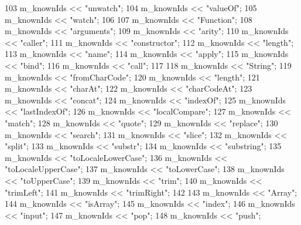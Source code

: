 \begin{DoxyCode}
103     m\_knownIds << \textcolor{stringliteral}{"unwatch"};
104     m\_knownIds << \textcolor{stringliteral}{"valueOf"};
105     m\_knownIds << \textcolor{stringliteral}{"watch"};
106 
107     m\_knownIds << \textcolor{stringliteral}{"Function"};
108     m\_knownIds << \textcolor{stringliteral}{"arguments"};
109     m\_knownIds << \textcolor{stringliteral}{"arity"};
110     m\_knownIds << \textcolor{stringliteral}{"caller"};
111     m\_knownIds << \textcolor{stringliteral}{"constructor"};
112     m\_knownIds << \textcolor{stringliteral}{"length"};
113     m\_knownIds << \textcolor{stringliteral}{"name"};
114     m\_knownIds << \textcolor{stringliteral}{"apply"};
115     m\_knownIds << \textcolor{stringliteral}{"bind"};
116     m\_knownIds << \textcolor{stringliteral}{"call"};
117 
118     m\_knownIds << \textcolor{stringliteral}{"String"};
119     m\_knownIds << \textcolor{stringliteral}{"fromCharCode"};
120     m\_knownIds << \textcolor{stringliteral}{"length"};
121     m\_knownIds << \textcolor{stringliteral}{"charAt"};
122     m\_knownIds << \textcolor{stringliteral}{"charCodeAt"};
123     m\_knownIds << \textcolor{stringliteral}{"concat"};
124     m\_knownIds << \textcolor{stringliteral}{"indexOf"};
125     m\_knownIds << \textcolor{stringliteral}{"lastIndexOf"};
126     m\_knownIds << \textcolor{stringliteral}{"localCompare"};
127     m\_knownIds << \textcolor{stringliteral}{"match"};
128     m\_knownIds << \textcolor{stringliteral}{"quote"};
129     m\_knownIds << \textcolor{stringliteral}{"replace"};
130     m\_knownIds << \textcolor{stringliteral}{"search"};
131     m\_knownIds << \textcolor{stringliteral}{"slice"};
132     m\_knownIds << \textcolor{stringliteral}{"split"};
133     m\_knownIds << \textcolor{stringliteral}{"substr"};
134     m\_knownIds << \textcolor{stringliteral}{"substring"};
135     m\_knownIds << \textcolor{stringliteral}{"toLocaleLowerCase"};
136     m\_knownIds << \textcolor{stringliteral}{"toLocaleUpperCase"};
137     m\_knownIds << \textcolor{stringliteral}{"toLowerCase"};
138     m\_knownIds << \textcolor{stringliteral}{"toUpperCase"};
139     m\_knownIds << \textcolor{stringliteral}{"trim"};
140     m\_knownIds << \textcolor{stringliteral}{"trimLeft"};
141     m\_knownIds << \textcolor{stringliteral}{"trimRight"};
142 
143     m\_knownIds << \textcolor{stringliteral}{"Array"};
144     m\_knownIds << \textcolor{stringliteral}{"isArray"};
145     m\_knownIds << \textcolor{stringliteral}{"index"};
146     m\_knownIds << \textcolor{stringliteral}{"input"};
147     m\_knownIds << \textcolor{stringliteral}{"pop"};
148     m\_knownIds << \textcolor{stringliteral}{"push"};

\end{DoxyCode}
